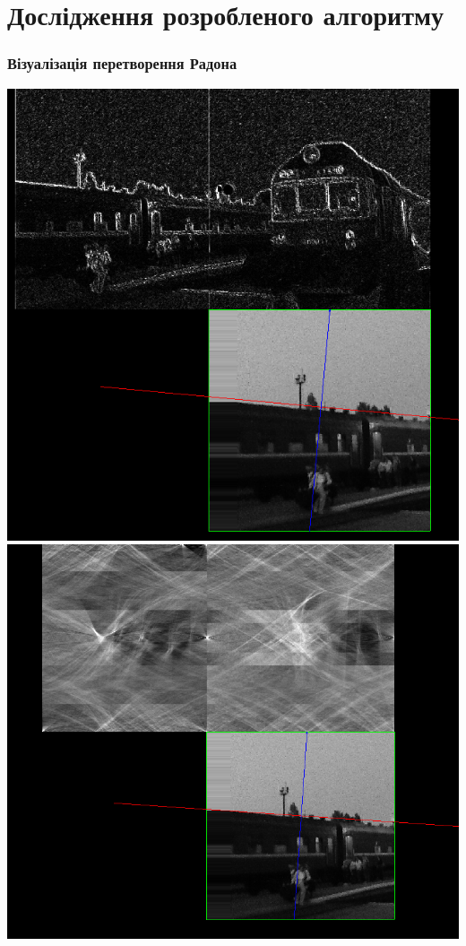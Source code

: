 \documentclass[12pt]{beamer}
\begin{document}
\section{Дослідження розробленого алгоритму}
\begin{frame}\frametitle{ Візуалізація перетворення Радона }
	\begin{multicols}{2}
		\includegraphics[scale=0.19]{images/radon_fa} 
		\columnbreak	
		\includegraphics[scale=0.185]{images/radon_fa_2}
	\end{multicols}
	
\end{frame}
\end{document}
